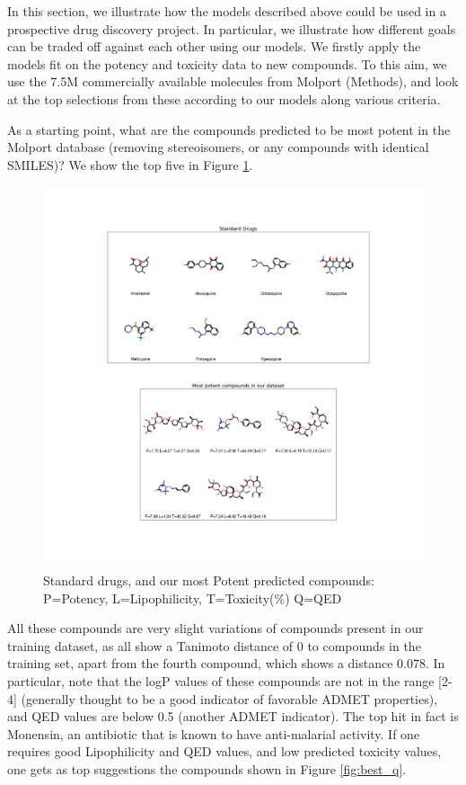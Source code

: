 \documentclass[journal=jacsat,manuscript=article]{achemso}
\begin{document}
In this section, we illustrate how the models described above could be used in a prospective drug discovery project. In particular, we illustrate how different goals can be traded off against each other using our models.
We firstly apply the models fit on the potency and toxicity data to new compounds.  To this aim, we use the 7.5M commercially available molecules from Molport (Methods), and look at the top selections from these according to our models along various criteria.

As a starting point, what are the compounds predicted to be most potent in the Molport database (removing stereoisomers, or any compounds with identical 
SMILES)?  We show the top five in Figure \ref{fig:mostpot}.

\begin{figure}[h!]
\centering
\includegraphics[width=\textwidth]{fig6_drugs_n_pot.png}
\caption{Standard drugs, and our most Potent predicted compounds: P=Potency, L=Lipophilicity, T=Toxicity(\%) Q=QED}
\label{fig:mostpot}
\end{figure}


All these compounds are very slight variations of compounds present in our training dataset, as all show a Tanimoto distance of 0 to compounds in the training set, apart from the fourth compound, which shows a distance 0.078.  
In particular, note that the logP values of these compounds are not in the range [2-4] (generally thought to be a good indicator of favorable ADMET properties), and QED values are below 0.5 (another ADMET indicator).
The top hit in fact is Monensin, an antibiotic that is known to have anti-malarial activity\cite{Ludwig2019}.
If one requires good Lipophilicity and QED values, and low predicted toxicity values, one gets as top suggestions the compounds shown in Figure \ref{fig:best_q}.
\end{document}
